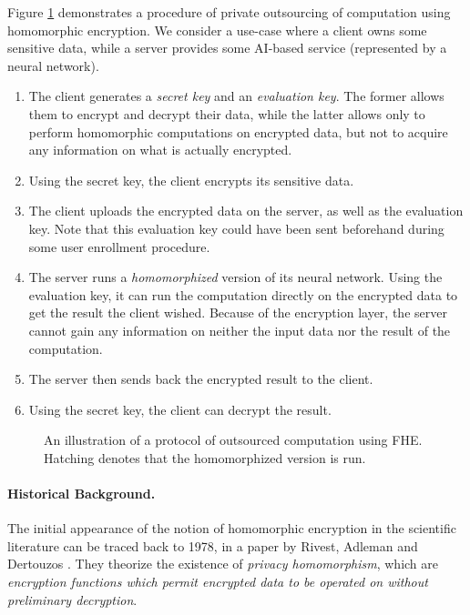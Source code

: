 Figure \ref{fig:classical_usage_fhe} demonstrates a procedure of private outsourcing of computation using homomorphic encryption. We consider a use-case where a client owns some sensitive data, while a server provides some AI-based service (represented by a neural network).

\begin{enumerate}
	\item The client generates a \textit{secret key} and an \textit{evaluation key}. The former allows them to encrypt and decrypt their data, while the latter allows only to perform homomorphic computations on encrypted data, but not to acquire any information on what is actually encrypted.
	\item Using the secret key, the client encrypts its sensitive data.
	\item The client uploads the encrypted data on the server, as well as the evaluation key. Note that this evaluation key could have been sent beforehand during some user enrollment procedure.
	\item The server runs a \textit{homomorphized} version of its neural network. Using the evaluation key, it can run the computation directly on the encrypted data to get the result the client wished. Because of the encryption layer, the server cannot gain any information on neither the input data nor the result of the computation.
	\item The server then sends back the encrypted result to the client.
	\item Using the secret key, the client can decrypt the result.
\end{enumerate}


\begin{figure}
	\centering
	
	\caption{An illustration of a protocol of outsourced computation using FHE. Hatching denotes that the homomorphized version is run.}
	\label{fig:classical_usage_fhe}
\end{figure}


\paragraph{Historical Background.}

The initial appearance of the notion of homomorphic encryption in the scientific literature can be traced back to 1978, in a paper by Rivest, Adleman and Dertouzos \cite{RAD78}. They theorize the existence of \textit{privacy homomorphism}, which are \textit{encryption functions which permit encrypted data to be operated on without preliminary decryption}.

